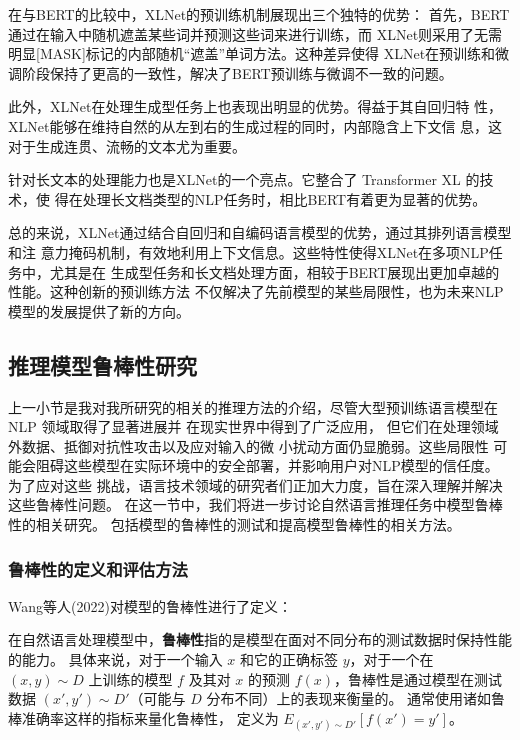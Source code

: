 在与BERT的比较中，XLNet的预训练机制展现出三个独特的优势：
首先，BERT通过在输入中随机遮盖某些词并预测这些词来进行训练，而
XLNet则采用了无需明显[MASK]标记的内部随机``遮盖''单词方法。这种差异使得
XLNet在预训练和微调阶段保持了更高的一致性，解决了BERT预训练与微调不一致的问题。

此外，XLNet在处理生成型任务上也表现出明显的优势。得益于其自回归特
性，XLNet能够在维持自然的从左到右的生成过程的同时，内部隐含上下文信
息，这对于生成连贯、流畅的文本尤为重要。

针对长文本的处理能力也是XLNet的一个亮点。它整合了
 Transformer XL\cite{dai2019transformer} 的技术，使
得在处理长文档类型的NLP任务时，相比BERT有着更为显著的优势。

总的来说，XLNet通过结合自回归和自编码语言模型的优势，通过其排列语言模型和注
意力掩码机制，有效地利用上下文信息。这些特性使得XLNet在多项NLP任务中，尤其是在
生成型任务和长文档处理方面，相较于BERT展现出更加卓越的性能。这种创新的预训练方法
不仅解决了先前模型的某些局限性，也为未来NLP模型的发展提供了新的方向。


\subsection{推理模型鲁棒性研究}
\label{sec1:robustness}
上一小节是我对我所研究的相关的推理方法的介绍，尽管大型预训练语言模型在NLP
领域取得了显著进展并
在现实世界中得到了广泛应用，
但它们在处理领域外数据、抵御对抗性攻击\cite{mccoy2019right,jin2020bert}以及应对输入的微
小扰动\cite{ebrahimi2018hotflip,belinkov2018synthetic}方面仍显脆弱。这些局限性
可能会阻碍这些模型在实际环境中的安全部署，并影响用户对NLP模型的信任度。为了应对这些
挑战，语言技术领域的研究者们正加大力度，旨在深入理解并解决这些鲁棒性问题。
在这一节中，我们将进一步讨论自然语言推理任务中模型鲁棒性的相关研究。
包括模型的鲁棒性的测试和提高模型鲁棒性的相关方法。

\subsubsection{鲁棒性的定义和评估方法}

Wang等人(2022)\cite{wang2022measure}对模型的鲁棒性进行了定义：

\begin{definition}[鲁棒性]
在自然语言处理模型中，\textbf{鲁棒性}指的是模型在面对不同分布的测试数据时保持性能的能力。
具体来说，对于一个输入 $x$ 和它的正确标签 $y$，对于一个在 $(x, y) \sim D$ 上训练的模型 
$f$ 及其对 $x$ 的预测 $f(x)$，鲁棒性是通过模型在测试数据 
$(x', y') \sim D'$（可能与 $D$ 分布不同）上的表现来衡量的。
通常使用诸如鲁棒准确率这样的指标来量化鲁棒性，
定义为 $E_{(x', y') \sim D'}[f(x') = y']$。
\end{definition}

